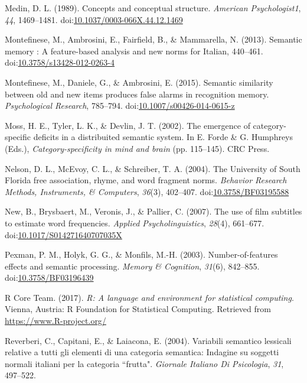 \documentclass[english,man]{apa6}
\theoremstyle{definition}
\theoremstyle{definition}
\theoremstyle{definition}
\theoremstyle{remark}
\begin{document}
\hypertarget{ref-Medin1989}{}
Medin, D. L. (1989). Concepts and conceptual structure. \emph{American
Psychologist1}, \emph{44}, 1469--1481.
doi:\href{https://doi.org/10.1037/0003-066X.44.12.1469}{10.1037/0003-066X.44.12.1469}

\hypertarget{ref-Montefinese2013}{}
Montefinese, M., Ambrosini, E., Fairfield, B., \& Mammarella, N. (2013).
Semantic memory : A feature-based analysis and new norms for Italian,
440--461.
doi:\href{https://doi.org/10.3758/s13428-012-0263-4}{10.3758/s13428-012-0263-4}

\hypertarget{ref-Montefinese2015}{}
Montefinese, M., Daniele, G., \& Ambrosini, E. (2015). Semantic
similarity between old and new items produces false alarms in
recognition memory. \emph{Psychological Research}, 785--794.
doi:\href{https://doi.org/10.1007/s00426-014-0615-z}{10.1007/s00426-014-0615-z}

\hypertarget{ref-Moss2002}{}
Moss, H. E., Tyler, L. K., \& Devlin, J. T. (2002). The emergence of
category-specific deficits in a distribuited semantic system. In E.
Forde \& G. Humphreys (Eds.), \emph{Category-specificity in mind and
brain} (pp. 115--145). CRC Press.

\hypertarget{ref-Nelson2004}{}
Nelson, D. L., McEvoy, C. L., \& Schreiber, T. A. (2004). The University
of South Florida free association, rhyme, and word fragment norms.
\emph{Behavior Research Methods, Instruments, \& Computers},
\emph{36}(3), 402--407.
doi:\href{https://doi.org/10.3758/BF03195588}{10.3758/BF03195588}

\hypertarget{ref-New2007}{}
New, B., Brysbaert, M., Veronis, J., \& Pallier, C. (2007). The use of
film subtitles to estimate word frequencies. \emph{Applied
Psycholinguistics}, \emph{28}(4), 661--677.
doi:\href{https://doi.org/10.1017/S014271640707035X}{10.1017/S014271640707035X}

\hypertarget{ref-Pexman2003}{}
Pexman, P. M., Holyk, G. G., \& Monfils, M.-H. (2003).
Number-of-features effects and semantic processing. \emph{Memory \&
Cognition}, \emph{31}(6), 842--855.
doi:\href{https://doi.org/10.3758/BF03196439}{10.3758/BF03196439}

\hypertarget{ref-R-base}{}
R Core Team. (2017). \emph{R: A language and environment for statistical
computing}. Vienna, Austria: R Foundation for Statistical Computing.
Retrieved from \url{https://www.R-project.org/}

\hypertarget{ref-Reverberi2004}{}
Reverberi, C., Capitani, E., \& Laiacona, E. (2004). Variabili semantico
lessicali relative a tutti gli elementi di una categoria semantica:
Indagine su soggetti normali italiani per la categoria ``frutta".
\emph{Giornale Italiano Di Psicologia}, \emph{31}, 497--522.
\end{document}
